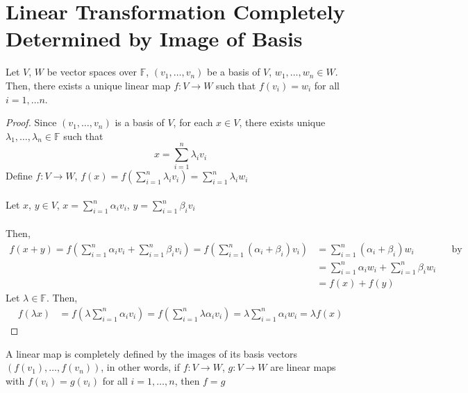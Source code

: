 \documentclass[letterpaper,12pt]{article}
\begin{document}
\section*{Linear Transformation Completely Determined by Image of Basis}
\begin{theorem}
Let $V$, $W$ be vector spaces over $\mathbb{F}$, $(v_1, \dots, v_n)$ be a basis of $V$, $w_1, \dots, w_n \in W$. Then, there exists a unique linear map $f: V \rightarrow W$ such that $f(v_i) = w_i$ for all $i = 1, \dots n$.
\end{theorem}
\begin{proof}
Since $(v_1, \dots, v_n)$ is a basis of $V$, for each $x \in V$, there exists unique $\lambda_1, \dots, \lambda_n \in \mathbb{F}$ such that
\begin{equation*}
    x = \sum_{i=1}^n \lambda_i v_i
\end{equation*}
Define $f: V \rightarrow W$, $f(x) = f\left(\sum_{i=1}^n \lambda_i v_i \right) = \sum_{i=1}^n \lambda_i w_i$
\\ \\ Let $x$, $y \in V$, $x = \sum_{i=1}^n \alpha_i v_i$, $y = \sum_{i=1}^n \beta_i v_i$
\\ \\ Then,
\begin{align*}
    f(x + y) = f\left(\sum_{i=1}^n \alpha_i v_i + \sum_{i=1}^n \beta_i v_i \right) = f\left(\sum_{i=1}^n (\alpha_i + \beta_i)v_i \right) & = \sum_{i=1}^n (\alpha_i + \beta_i) w_i && \text{by construction} \\
    & = \sum_{i=1}^n \alpha_i w_i + \sum_{i=1}^n \beta_i w_i \\
    & = f(x) + f(y)
\end{align*}
Let $\lambda \in \mathbb{F}$. Then,
\begin{align*}
    f(\lambda x) & = f\left(\lambda \sum_{i=1}^n \alpha_i v_i \right) = f\left(\sum_{i=1}^n \lambda \alpha_i v_i \right) = \lambda \sum_{i=1}^n \alpha_i w_i = \lambda f(x)
\end{align*}
\end{proof}

\begin{corollary}
A linear map is completely defined by the images of its basis vectors $(f(v_1), \dots, f(v_n))$, in other words, if $f: V \rightarrow W$, $g: V \rightarrow W$ are linear maps with $f(v_i) = g(v_i)$ for all $i = 1, \dots, n$, then $f = g$
\end{corollary}
\end{document}
